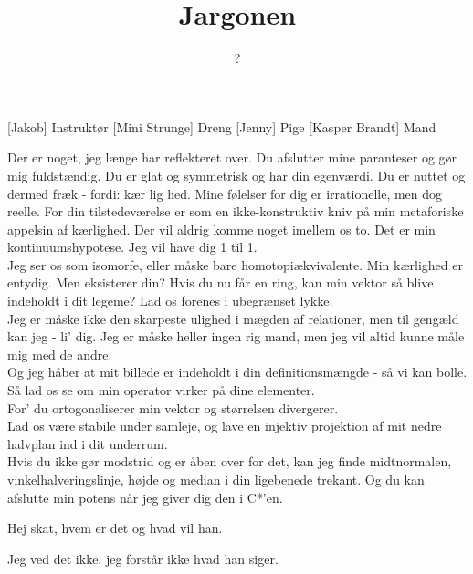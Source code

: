 \documentclass[a4paper,11pt]{article}
\title{Jargonen}
\author{?}
\begin{document}
\maketitle

\begin{roles}
[Jakob] Instruktør
[Mini Strunge] Dreng
[Jenny] Pige
[Kasper Brandt] Mand
\end{roles}

\begin{props}
\end{props}


\begin{sketch}

 Der er noget, jeg længe har reflekteret over.
Du afslutter mine paranteser og gør mig fuldstændig.
Du er glat og symmetrisk og har din egenværdi.
Du er nuttet og dermed fræk - fordi: kær lig hed.
Mine følelser for dig er irrationelle, men dog reelle. 
For din tilstedeværelse er som en ikke-konstruktiv kniv på min metaforiske appelsin af kærlighed.
Der vil aldrig komme noget imellem os to. Det er min kontinuumshypotese. Jeg vil have dig 1 til 1.  \\
Jeg ser os som isomorfe, eller måske bare homotopiækvivalente.
Min kærlighed er entydig. Men eksisterer din?
Hvis du nu får en ring, kan min vektor så blive indeholdt i dit legeme?
 Lad os forenes i ubegrænset lykke. \\
Jeg er måske ikke den skarpeste ulighed i mægden af relationer, men til gengæld kan jeg - li' dig.
Jeg er måske heller ingen rig mand, men jeg vil altid kunne måle mig med de andre. \\
Og jeg håber at mit billede er indeholdt i din definitionsmængde - så vi kan bolle.
Så lad os se om min operator virker på dine elementer. \\
For' du ortogonaliserer min vektor og størrelsen divergerer. \\
Lad os være stabile under samleje, og lave en injektiv projektion af mit nedre halvplan ind i dit underrum. \\
Hvis du ikke gør modstrid og er åben over for det, kan jeg finde midtnormalen, vinkelhalveringslinje, højde og median i din ligebenede trekant. 
Og du kan afslutte min potens når jeg giver dig den i C*'en.

 Hej skat, hvem er det og hvad vil han.

 Jeg ved det ikke, jeg forstår ikke hvad han siger.

\end{sketch}
\end{document}
